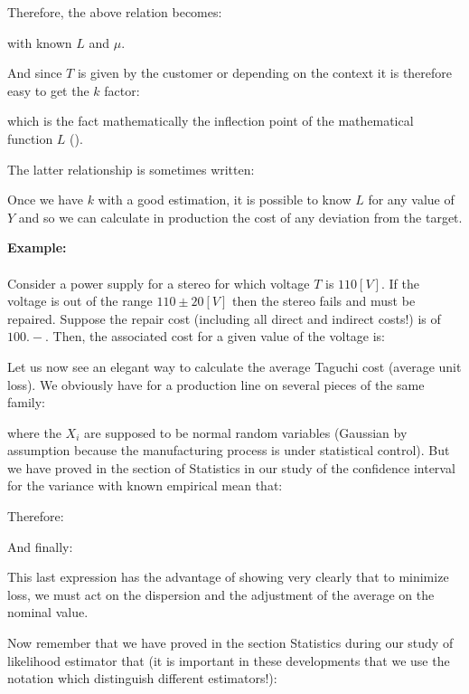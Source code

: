 	Therefore, the above relation becomes:
	
	with known $L$ and $\mu$.
	
	And since $T$ is given by the customer or depending on the context it is therefore easy to get the $k$ factor:
	
	which is the fact mathematically the inflection point of the mathematical function $L$ ().
	
	The latter relationship is sometimes written:
	
	
	Once we have $k$ with a good estimation, it is possible to know $L$ for any value of $Y$ and so we can calculate in production the cost of any deviation from the target.
	
	\begin{tcolorbox}[colframe=black,colback=white,sharp corners]
	\textbf{{\Large {}}Example:}\\\\
	Consider a power supply for a stereo for which voltage $T$ is $110 [V]$. If the voltage is out of the range $110\pm 20 [V]$ then the stereo fails and must be repaired. Suppose the repair cost (including all direct and indirect costs!) is of $100.-$. Then, the associated cost for a given value of the voltage is:
	
	\end{tcolorbox}
	
	Let us now see an elegant way to calculate the average Taguchi cost (average unit loss). We obviously have for a production line on several pieces of the same family:
	
	where the $X_i$ are supposed to be normal random variables (Gaussian by  assumption because the manufacturing process is under statistical control). But we have proved in the section of Statistics in our study of the confidence interval for the variance with known empirical mean that:
	
	Therefore:
	
	And finally:
	
	This last expression has the advantage of showing very clearly that to minimize loss, we must act on the dispersion and the adjustment of the average on the nominal value.
	
	Now remember that we have proved in the section Statistics during our study of likelihood estimator that (it is important in these developments that we use the notation which distinguish different estimators!):
	
